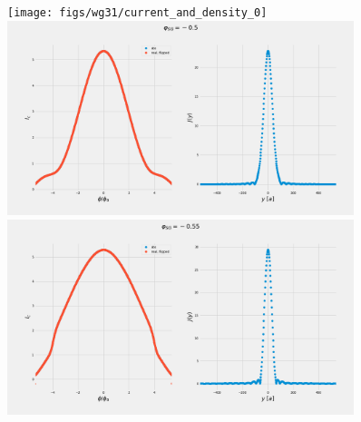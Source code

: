 \documentclass[a4paper]{article}
\begin{document}
\begin{figure}
	\texttt{[image: figs/wg31/current\_and\_density\_0]}
	\includegraphics[width=0.9\textwidth]{figs/wg31/current_and_density_05}
	\includegraphics[width=0.9\textwidth]{figs/wg31/current_and_density_055}
\end{figure}
\end{document}
